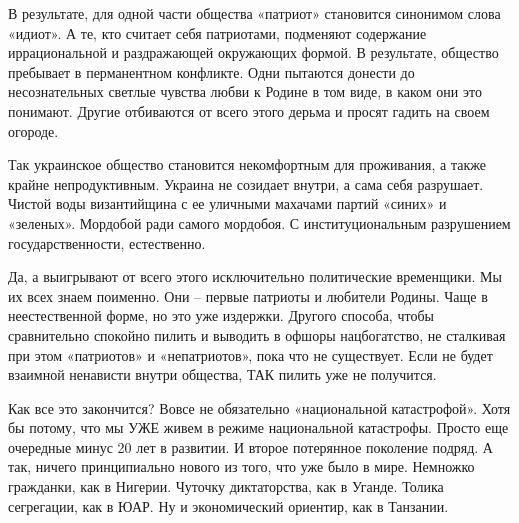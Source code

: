 В результате, для одной части общества «патриот» становится синонимом слова
«идиот». А те, кто считает себя патриотами, подменяют содержание иррациональной
и раздражающей окружающих формой. В результате, общество пребывает в
перманентном конфликте. Одни пытаются донести до несознательных светлые чувства
любви к Родине в том виде, в каком они это понимают. Другие отбиваются от всего
этого дерьма и просят гадить на своем огороде.

Так украинское общество становится некомфортным для проживания, а также крайне
непродуктивным. Украина не созидает внутри, а сама себя разрушает. Чистой воды
византийщина с ее уличными махачами партий «синих» и «зеленых». Мордобой ради
самого мордобоя. С институциональным разрушением государственности,
естественно.

Да, а выигрывают от всего этого исключительно политические временщики. Мы их
всех знаем поименно. Они – первые патриоты и любители Родины. Чаще в
неестественной форме, но это уже издержки. Другого способа, чтобы сравнительно
спокойно пилить и выводить в офшоры нацбогатство, не сталкивая при этом
«патриотов» и «непатриотов», пока что не существует. Если не будет взаимной
ненависти внутри общества, ТАК пилить уже не получится.

Как все это закончится? Вовсе не обязательно «национальной катастрофой». Хотя
бы потому, что мы УЖЕ живем в режиме национальной катастрофы. Просто еще
очередные минус 20 лет в развитии. И второе потерянное поколение подряд. А так,
ничего принципиально нового из того, что уже было в мире. Немножко гражданки,
как в Нигерии. Чуточку диктаторства, как в Уганде. Толика сегрегации, как в
ЮАР. Ну и экономический ориентир, как в Танзании.

